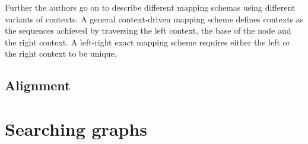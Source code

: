 \documentclass[thesis.tex]{subfiles}
\begin{document}
Further the authors go on to describe different mapping schemas using different variants of contexts. A general context-driven mapping scheme defines contexts as the sequences achieved by traversing the left context, the base of the node and the right context. A left-right exact mapping scheme requires either the left or the right context to be unique. 
\subsection{Alignment}

\section{Searching graphs}
\end{document}

